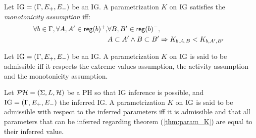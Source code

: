 \begin{property}
\label{prop:param_enum_monotonicity}
Let $\mathrm{IG} = (\Gamma, E_+, E_-)$ be an IG. A parametrization $K$ on $\mathrm{IG}$ satisfies the \emph{monotonicity assumption} iff:
\begin{align*}
  \forall b \in \Gamma, \forall A, A' \in \mathsf{reg}({b})^+, &\forall B, B' \in \mathsf{reg}({b})^-,
\\
  &A \subset A' \wedge B \subset B' \Rightarrow K_{b,A,B} < K_{b,A',B'}
\end{align*}
\end{property}

\begin{definition}
Let $\mathrm{IG} = (\Gamma, E_+, E_-)$ be an IG. A parametrization $K$ on $\mathrm{IG}$ is said to be admissible iff it respects the extreme values assumption, the activity assumption and the monotonicity assumption.
\end{definition}

\begin{definition}
\label{prop:param_enum_inf}
Let $\mathcal{PH} = (\Sigma, L, \mathcal{H})$ be a PH so that IG inference is possible, and $\mathrm{IG} = (\Gamma, E_+,
E_-)$ the inferred IG. A parametrization $K$ on $\mathrm{IG}$ is said to be admissible with respect to the
inferred parameters iff it is admissible and that all parameters that can be inferred regarding
theorem (\ref{thm:param_K}) are equal to their inferred value.
\end{definition}



